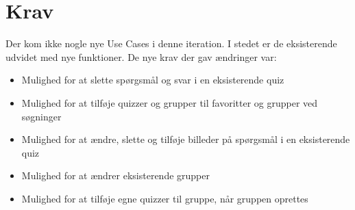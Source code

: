 \section{Krav}

Der kom ikke nogle nye Use Cases i denne iteration. I stedet er de eksisterende udvidet med nye funktioner. De nye krav der gav ændringer var:

\begin{itemize}
	\item Mulighed for at slette spørgsmål og svar i en eksisterende quiz
	\item Mulighed for at tilføje quizzer og grupper til favoritter og grupper ved søgninger
	\item Mulighed for at ændre, slette og tilføje billeder på spørgsmål i en eksisterende quiz
	\item Mulighed for at ændrer eksisterende grupper
	\item Mulighed for at tilføje egne quizzer til gruppe, når gruppen oprettes
\end{itemize}